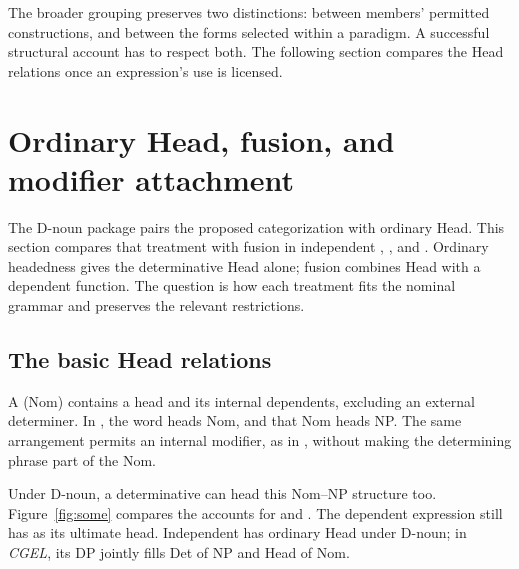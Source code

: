 \documentclass[12pt]{article}
\begin{document}
The broader grouping preserves two distinctions: between members' permitted constructions, and between the forms selected within a paradigm. A successful structural account has to respect both. The following section compares the Head relations once an expression's use is licensed.

\section{Ordinary Head, fusion, and modifier attachment}\label{sec:evidence}

The D-noun package pairs the proposed categorization with ordinary Head. This section compares that treatment with fusion in independent , , and . Ordinary headedness gives the determinative Head alone; fusion combines Head with a dependent function. The question is how each treatment fits the nominal grammar and preserves the relevant restrictions.

\subsection{The basic Head relations}\label{sec:head-relations}

A  (Nom) contains a head and its internal dependents, excluding an external determiner. In , the word  heads Nom, and that Nom heads NP. The same arrangement permits an internal modifier, as in , without making the determining phrase part of the Nom.

Under D-noun, a determinative can head this Nom--NP structure too. Figure~\ref{fig:some} compares the accounts for  and . The dependent expression still has  as its ultimate head. Independent  has ordinary Head under D-noun; in \textit{CGEL}, its DP jointly fills Det of NP and Head of Nom.
\end{document}
